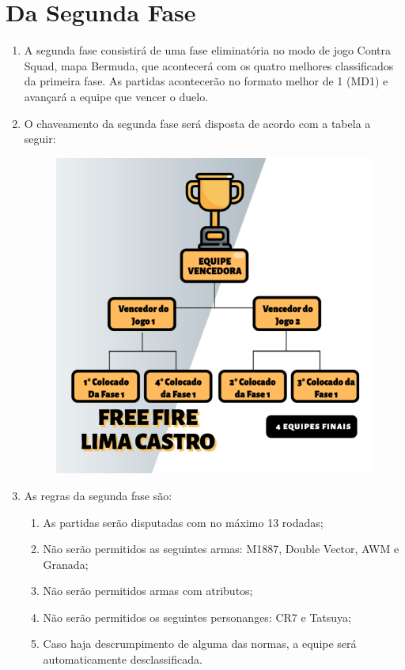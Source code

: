 \section*{Da Segunda Fase}

\begin{enumerate}[start=1,label={\bfseries Art. \arabic*$^\circ$ - }, resume]
    \item A segunda fase consistirá de uma fase eliminatória no modo de jogo
        Contra Squad, mapa Bermuda, que acontecerá com os quatro melhores classificados da
        primeira fase. As partidas acontecerão no formato melhor de 1 (MD1)
        e avançará a equipe que vencer o duelo.
    \item O chaveamento da segunda fase será disposta de acordo com a tabela
        a seguir:

        \begin{figure}[H]
          \centering
          \includegraphics[width=.9\linewidth]{2-Imagens/bracket.png}
        \end{figure}

    \item As regras da segunda fase são:
        \begin{enumerate}[label={\bfseries \Roman* - }]
            \item As partidas serão disputadas com no máximo 13 rodadas;
            \item Não serão permitidos as seguintes armas: M1887, Double Vector, AWM e Granada;
            \item Não serão permitidos armas com atributos;
            \item Não serão permitidos os seguintes personanges: CR7 e Tatsuya;
            \item  Caso haja descrumpimento de alguma das normas, a equipe será automaticamente desclassificada.
        \end{enumerate}
\end{enumerate}

